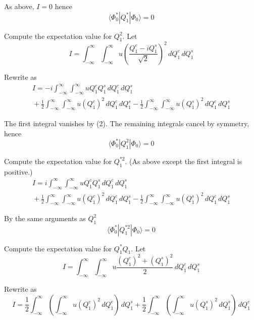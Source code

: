 \documentclass[12pt]{article}
\begin{document}
As above, $I=0$ hence
\begin{equation*}
\langle\Phi_0^*|Q_1^*|\Phi_0\rangle=0
\end{equation*}

Compute the expectation value for $Q_1^2$.
Let
\begin{equation*}
I=\int_{-\infty}^\infty\int_{-\infty}^\infty
u\left(\frac{Q_1^c-iQ_1^s}{\sqrt2}\right)^2\,dQ_1^c\,dQ_1^s
\end{equation*}

Rewrite as
\begin{multline*}
I=-i\int_{-\infty}^\infty\int_{-\infty}^\infty
uQ_1^cQ_1^s\,dQ_1^c\,dQ_1^s
\\
{}+\frac{1}{2}
\int_{-\infty}^\infty\int_{-\infty}^\infty
u(Q_1^c)^2\,dQ_1^c\,dQ_1^s
-\frac{1}{2}
\int_{-\infty}^\infty\int_{-\infty}^\infty
u(Q_1^s)^2\,dQ_1^c\,dQ_1^s
\end{multline*}

The first integral vanishes by (2).
The remaining integrals cancel by symmetry, hence
\begin{equation*}
\langle\Phi_0^*|Q_1^2|\Phi_0\rangle=0
\end{equation*}

Compute the expectation value for $Q_1^{*2}$.
(As above except the first integral is positive.)
\begin{multline*}
I=i\int_{-\infty}^\infty\int_{-\infty}^\infty
uQ_1^cQ_1^s\,dQ_1^c\,dQ_1^s
\\
{}+\frac{1}{2}
\int_{-\infty}^\infty\int_{-\infty}^\infty
u(Q_1^c)^2\,dQ_1^c\,dQ_1^s
-\frac{1}{2}
\int_{-\infty}^\infty\int_{-\infty}^\infty
u(Q_1^s)^2\,dQ_1^c\,dQ_1^s
\end{multline*}

By the same arguments as $Q_1^2$
\begin{equation*}
\langle\Phi_0^*|Q_1^{*2}|\Phi_0\rangle=0
\end{equation*}

Compute the expectation value for $Q_1^*Q_1$.
Let
\begin{equation*}
I=\int_{-\infty}^\infty\int_{-\infty}^\infty
u\frac{(Q_1^c)^2+(Q_1^s)^2}{2}\,dQ_1^c\,dQ_1^s
\end{equation*}

Rewrite as
\begin{equation*}
I=\frac{1}{2}\int_{-\infty}^\infty\left(\int_{-\infty}^\infty u(Q_1^c)^2\,dQ_1^c\right)\,dQ_1^s
+\frac{1}{2}\int_{-\infty}^\infty\left(\int_{-\infty}^\infty u(Q_1^s)^2\,dQ_1^s\right)\,dQ_1^c
\end{equation*}
\end{document}
